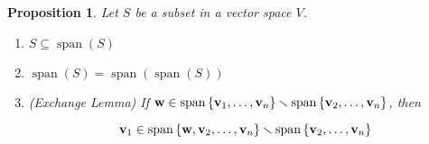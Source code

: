 \documentclass[11pt]{article}
\newtheorem{proposition}[theorem]{Proposition}
\begin{document}
\begin{proposition} \label{prop:exchangelem}
Let \(S\) be a subset in a vector space \(V\).

\begin{enumerate}
\item \(S \subseteq  \operatorname{span}\left( S\right)\)

\item \(\operatorname{span}\left( S\right)  = \operatorname{span}\left( {\operatorname{span}\left( S\right) }\right)\)

\item (Exchange Lemma) If \(\mathbf{w} \in  \operatorname{span}\left\{  {{\bf v}_1,\ldots ,{\bf v}_n}\right\}   \smallsetminus  \operatorname{span}\left\{  {{\bf v}_2,\ldots ,{\bf v}_n}\right\}\), then

\[
{\bf v}_1 \in  \operatorname{span}\left\{  {\mathbf{w},{\bf v}_2,\ldots ,{\bf v}_n}\right\}   \smallsetminus  \operatorname{span}\left\{  {{\bf v}_2,\ldots ,{\bf v}_n}\right\}
\]
\end{enumerate}
\end{proposition}
\end{document}
